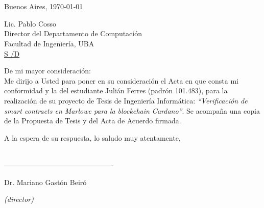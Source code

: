 \documentclass[a4paper, 12pt]{iopart}
\begin{document}

\maketitle

\section*{}\label{carta}

\begin{flushright}Buenos Aires, \today\end{flushright}

\vspace{0.4cm}
\noindent Lic. Pablo Cosso\\
\noindent Director del Departamento de Computación \\
Facultad de Ingeniería, UBA \\
\underline{S \hspace{3.55cm}/\hspace{3.55cm}D}\\

\vspace{0.4cm}

\noindent De mi mayor consideración:\\

Me dirijo a Usted para poner en su consideración el Acta en que consta mi conformidad y la del estudiante Julián Ferres (padrón 101.483), para la realización de su proyecto de Tesis de Ingeniería Informática: \textit{``Verificación de smart contracts en Marlowe para la blockchain Cardano''}.
Se acompaña una copia de la Propuesta de Tesis y del Acta de Acuerdo firmada.

A la espera de su respuesta, lo saludo muy atentamente,\\
\\

\vspace{2.2cm}

----------------------------------------------

\hspace{0.45cm} Dr. Mariano Gastón Beiró

\hspace{2.0cm} \textit{(director)} \\
\end{document}
